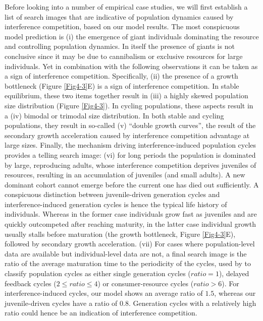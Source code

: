 Before looking into a number of empirical case studies, we will first establish
a list of search images that are indicative of population dynamics caused by
interference competition, based on our model results. The most conspicuous model
prediction is (i) the emergence of giant individuals dominating the resource and
controlling population dynamics. In itself the presence of giants is not
conclusive since it may be due to cannibalism
\autocite{claessen2000a,persson2003a} or exclusive resources for large
individuals. Yet in combination with the following observations it can be taken
as a sign of interference competition. Specifically, (ii) the presence of a
growth bottleneck (Figure \ref{Fig4-3}E) is a sign of interference competition.
In stable equilibrium, these two items together result in (iii) a highly skewed
population size distribution (Figure \ref{Fig4-3}). In cycling populations,
these aspects result in a (iv) bimodal or trimodal size distribution. In both
stable and cycling populations, they result in so-called (v) “double growth
curves”, the result of the secondary growth acceleration caused by interference
competition advantage at large sizes.
Finally, the mechanism driving interference-induced population cycles provides a
telling search image: (vi) for long periods the population is dominated by
large, reproducing adults, whose interference competition deprives juveniles of
resources, resulting in an accumulation of juveniles (and small adults). A new
dominant cohort cannot emerge before the current one has died out sufficiently.
A conspicuous distinction between juvenile-driven generation cycles and
interference-induced generation cycles is hence the typical life history of
individuals. Whereas in the former case individuals grow fast as juveniles and
are quickly outcompeted after reaching maturity, in the latter case individual
growth usually stalls before maturation (the growth bottleneck, Figure
\ref{Fig4-3}E), followed by secondary growth acceleration. (vii) For cases where
population-level data are available but individual-level data are not, a final
search image is the ratio of the average maturation time to the periodicity of
the cycles, used by \textcite{murdoch2002a} to classify
population cycles as either single generation cycles ($ratio = 1$), delayed
feedback cycles ($2\leq ratio \leq 4$) or consumer-resource cycles ($ratio >
6$). For interference-induced cycles, our model shows an average ratio of $1.5$,
whereas our juvenile-driven cycles have a ratio of $0.8$. Generation cycles with
a relatively high ratio could hence be an indication of interference competition.

